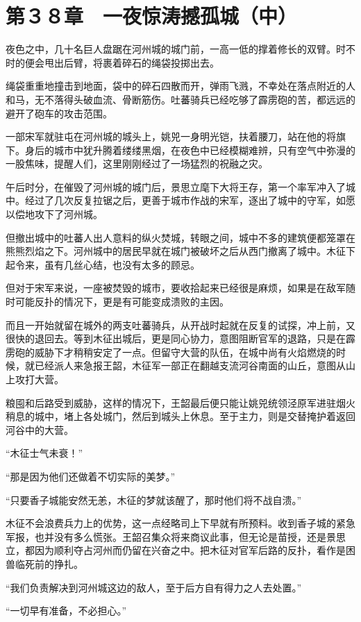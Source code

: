 \section{第３８章　一夜惊涛撼孤城（中） }

夜色之中，几十名巨人盘踞在河州城的城门前，一高一低的撑着修长的双臂。时不时的便会甩出后臂，将裹着碎石的绳袋投掷出去。

绳袋重重地撞击到地面，袋中的碎石四散而开，弹雨飞溅，不幸处在落点附近的人和马，无不落得头破血流、骨断筋伤。吐蕃骑兵已经吃够了霹雳砲的苦，都远远的避开了砲车的攻击范围。

一部宋军就驻屯在河州城的城头上，姚兕一身明光铠，扶着腰刀，站在他的将旗下。身后的城市中犹升腾着缕缕黑烟，在夜色中已经模糊难辨，只有空气中弥漫的一股焦味，提醒人们，这里刚刚经过了一场猛烈的祝融之灾。

午后时分，在催毁了河州城的城门后，景思立麾下大将王存，第一个率军冲入了城中。经过了几次反复拉锯之后，更善于城市作战的宋军，逐出了城中的守军，如愿以偿地攻下了河州城。

但撤出城中的吐蕃人出人意料的纵火焚城，转眼之间，城中不多的建筑便都笼罩在熊熊烈焰之下。河州城中的居民早就在城门被破坏之后从西门撤离了城中。木征下起令来，虽有几丝心结，也没有太多的顾忌。

但对于宋军来说，一座被焚毁的城市，要收拾起来已经很是麻烦，如果是在敌军随时可能反扑的情况下，更是有可能变成溃败的主因。

而且一开始就留在城外的两支吐蕃骑兵，从开战时起就在反复的试探，冲上前，又很快的退回去。等到木征出城后，更是同心协力，意图阻断官军的退路，只是在霹雳砲的威胁下才稍稍安定了一点。但留守大营的队伍，在城中尚有火焰燃烧的时候，就已经派人来急报王韶，木征军一部正在翻越支流河谷南面的山丘，意图从山上攻打大营。

粮囤和后路受到威胁，这样的情况下，王韶最后便只能让姚兕统领泾原军进驻烟火稍息的城中，堵上各处城门，然后到城头上休息。至于主力，则是交替掩护着返回河谷中的大营。

“木征士气未衰！”

“那是因为他们还做着不切实际的美梦。”

“只要香子城能安然无恙，木征的梦就该醒了，那时他们将不战自溃。”

木征不会浪费兵力上的优势，这一点经略司上下早就有所预料。收到香子城的紧急军报，也并没有多么慌张。王韶召集众将来商议此事，但无论是苗授，还是景思立，都因为顺利夺占河州而仍留在兴奋之中。把木征对官军后路的反扑，看作是困兽临死前的挣扎。

“我们负责解决到河州城这边的敌人，至于后方自有得力之人去处置。”

“一切早有准备，不必担心。”

